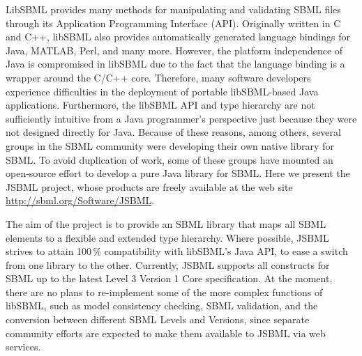\documentclass{bioinfo}
\begin{document}
LibSBML provides many methods for manipulating and validating
SBML files through its Application Programming Interface (API).
Originally written in C and C++, libSBML also provides automatically generated 
language bindings for Java\texttrademark, MATLAB\texttrademark, Perl, and
many more. However, the platform independence of Java is compromised
in libSBML due to the fact that the language binding is a
wrapper around the C/C++ core. 
Therefore, many software developers experience difficulties in
the deployment of portable libSBML-based Java applications.
Furthermore, the libSBML API and type hierarchy are not sufficiently intuitive
from a Java programmer's perspective just because they were not
designed directly for Java.
Because of these reasons, among others, several groups in the SBML community
were developing their own native library for SBML. To avoid duplication of
work, some of these groups have mounted an open-source effort to
develop a pure Java library for SBML. Here we present the JSBML
project, whose products are freely available at the web site
\href{http://sbml.org/Software/JSBML}{http://sbml.org/Software/JSBML}.

The aim of the project is to provide an SBML
library that maps all SBML elements to a flexible and extended
type hierarchy. Where possible, JSBML strives to attain
100\,\% compatibility with libSBML's Java API, to ease a switch from
one library to the other. Currently, JSBML supports all constructs
for SBML up to the latest Level 3 Version 1 Core specification. At the moment,
there are no plans to re-implement some of the more complex functions of
libSBML, such as model consistency checking, SBML validation,
and the conversion between different SBML Levels and Versions,
since separate community efforts are expected to make them
available to JSBML via web services.

\end{document}
